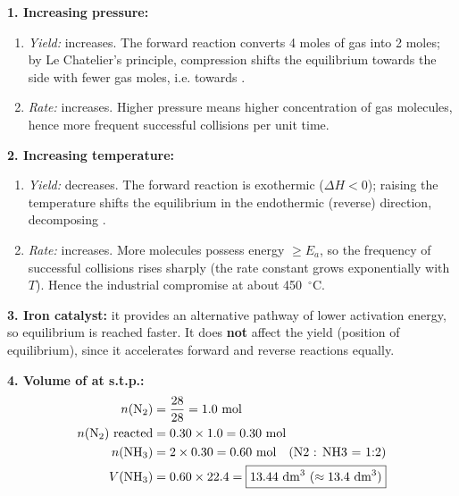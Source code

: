 \documentclass[11pt]{article}
\begin{document}
\begin{corrige}
\textbf{1. Increasing pressure:}
\begin{enumerate}
\item[(a)] \emph{Yield:} increases. The forward reaction converts 4 moles of gas into 2 moles; by Le Chatelier's principle, compression shifts the equilibrium towards the side with fewer gas moles, i.e. towards .
\item[(b)] \emph{Rate:} increases. Higher pressure means higher concentration of gas molecules, hence more frequent successful collisions per unit time.
\end{enumerate}

\textbf{2. Increasing temperature:}
\begin{enumerate}
\item[(a)] \emph{Yield:} decreases. The forward reaction is exothermic ($\Delta H < 0$); raising the temperature shifts the equilibrium in the endothermic (reverse) direction, decomposing .
\item[(b)] \emph{Rate:} increases. More molecules possess energy $\geq E_a$, so the frequency of successful collisions rises sharply (the rate constant grows exponentially with $T$). Hence the industrial compromise at about \SI{450}{\ensuremath{{}^{\circ}\mathrm{C}}}.
\end{enumerate}

\textbf{3. Iron catalyst:} it provides an alternative pathway of lower activation energy, so equilibrium is reached faster. It does \textbf{not} affect the yield (position of equilibrium), since it accelerates forward and reverse reactions equally.

\textbf{4. Volume of  at s.t.p.:}
\begin{align*}
n(\ce{N2}) &= \frac{28}{28} = 1.0\ \mathrm{mol}\\
n(\ce{N2})\text{ reacted} &= 0.30 \times 1.0 = 0.30\ \mathrm{mol}\\
n(\ce{NH3}) &= 2 \times 0.30 = 0.60\ \mathrm{mol} \quad (\text{N2 : NH3 = 1:2})\\
V(\ce{NH3}) &= 0.60 \times 22.4 = \boxed{13.44\ \mathrm{dm^{3}}\ (\approx 13.4\ \mathrm{dm^{3}})}
\end{align*}
\end{corrige}
\end{document}
